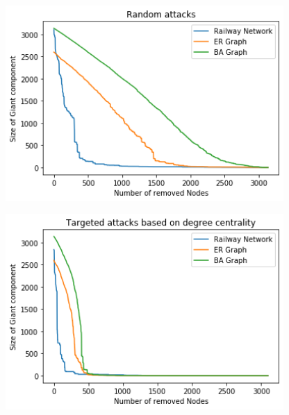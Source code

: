 \documentclass{Resources/netsci-project}
\begin{document}
\begin{center}
    \centering
    \includegraphics[width=300pt]{Resources/ba_er_random_attacks}
    \label{fig:RandomNetworkRandomAttacks}
\end{center}

\begin{center}
    \centering
    \includegraphics[width=300pt]{Resources/ba_er_targeted_attacks}
    \label{fig:RandomNetworkTargetedAttacks}
\end{center}
\end{document}
